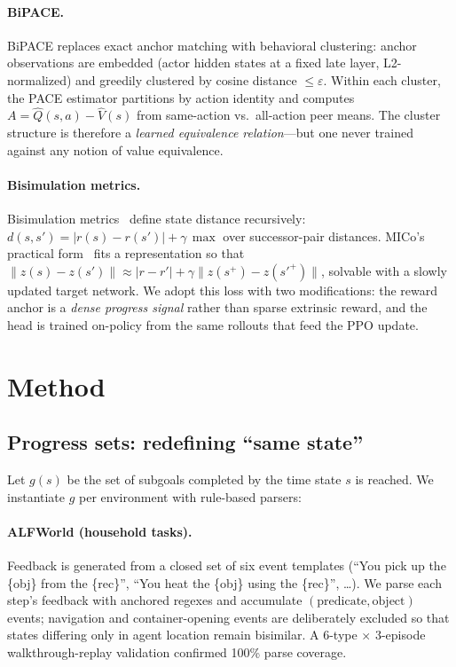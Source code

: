 \documentclass[sigconf]{acmart}
\begin{document}
\paragraph{BiPACE.}
BiPACE replaces exact anchor matching with behavioral clustering:
anchor observations are embedded (actor hidden states at a fixed late
layer, L2-normalized) and greedily clustered by cosine distance
$\le\varepsilon$. Within each cluster, the PACE estimator partitions by
action identity and computes $A=\hat{Q}(s,a)-\hat{V}(s)$ from
same-action vs.\ all-action peer means. The cluster structure is
therefore a \emph{learned equivalence relation}---but one never trained
against any notion of value equivalence.

\paragraph{Bisimulation metrics.}
Bisimulation metrics~\cite{ferns2011bisimulation} define state distance
recursively: $d(s,s') = |r(s)-r(s')| + \gamma\,\max$ over successor-pair
distances. MICo's practical form~\cite{micobisim} fits a representation
so that $\|z(s)-z(s')\| \approx |r-r'| + \gamma\|z(s^+)-z(s'^+)\|$,
solvable with a slowly updated target network. We adopt this loss with
two modifications: the reward anchor is a \emph{dense progress signal}
rather than sparse extrinsic reward, and the head is trained on-policy
from the same rollouts that feed the PPO update.

\section{Method}
\label{sec:method}

\subsection{Progress sets: redefining ``same state''}
\label{sec:gspec}

Let $g(s)$ be the set of subgoals completed by the time state $s$ is
reached. We instantiate $g$ per environment with rule-based parsers:

\paragraph{ALFWorld (household tasks).} Feedback is generated from a
closed set of six event templates (``You pick up the \{obj\} from the
\{rec\}'', ``You heat the \{obj\} using the \{rec\}'', \dots). We parse
each step's feedback with anchored regexes and accumulate
$(\text{predicate},\text{object})$ events; navigation and
container-opening events are deliberately excluded so that states
differing only in agent location remain bisimilar. A 6-type $\times$
3-episode walkthrough-replay validation confirmed 100\% parse coverage.
\end{document}
